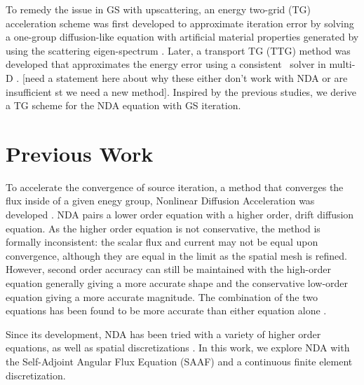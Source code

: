 To remedy the issue in GS with upscattering, an energy two-grid (TG) acceleration scheme was first developed to approximate iteration error by solving a one-group diffusion-like equation with artificial material properties generated by using the scattering eigen-spectrum \cite{morel-upscat}. Later, a transport TG (TTG) method was developed that approximates the energy error using a consistent \sn\ solver in multi-D \cite{evans-upscat}. [need a statement here about why these either don't work with NDA or are insufficient st we need a new method]. Inspired by the previous studies, we derive a TG scheme for the NDA equation with GS iteration.


\section{Previous Work}
To accelerate the convergence of source iteration, a method that converges the flux inside of a given enegy group, Nonlinear Diffusion Acceleration was developed \cite{Knoll2011} \cite{park-nda}. 
NDA pairs a lower order equation with a higher order, drift diffusion equation. 
As the higher order equation is not conservative, the method is formally inconsistent: the scalar flux and current may not be equal upon convergence,
although they are equal in the limit as the spatial mesh is refined. However, second order accuracy
 can still be maintained with the high-order equation generally giving a more accurate shape and the conservative low-order equation giving a more accurate magnitude.
 The combination of the two equations has been found to be more accurate than either equation alone \cite{morel-holo}.
 
Since its development, NDA has been tried with a variety of higher order equations, \cite{morel-holo}\cite{Wang2013} as well as spatial discretizations \cite{morel-holo}\cite{Schunert2017}. In this work, we explore NDA with the Self-Adjoint Angular Flux Equation (SAAF) and a continuous finite element discretization.

